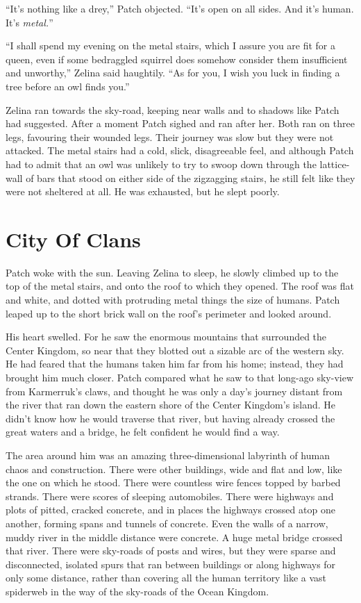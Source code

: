 \documentclass[12pt]{memoir}
\begin{document}
“It’s nothing like a drey,” Patch objected. “It’s open on all
sides. And it’s human. It’s \textit{metal.}”

“I shall spend my evening on the metal stairs, which I assure you are
fit for a queen, even if some bedraggled squirrel does somehow
consider them insufficient and unworthy,” Zelina said haughtily. “As
for you, I wish you luck in finding a tree before an owl finds you.”

Zelina ran towards the sky-road, keeping near walls and to shadows
like Patch had suggested. After a moment Patch sighed and ran after
her. Both ran on three legs, favouring their wounded legs. Their
journey was slow but they were not attacked. The metal stairs had a
cold, slick, disagreeable feel, and although Patch had to admit that
an owl was unlikely to try to swoop down through the lattice-wall of
bars that stood on either side of the zigzagging stairs, he still felt
like they were not sheltered at all. He was exhausted, but he slept
poorly.


\section{City Of Clans}

Patch woke with the sun. Leaving Zelina to sleep, he slowly climbed up
to the top of the metal stairs, and onto the roof to which they
opened. The roof was flat and white, and dotted with protruding metal
things the size of humans. Patch leaped up to the short brick wall on
the roof’s perimeter and looked around.

His heart swelled. For he saw the enormous mountains that surrounded
the Center Kingdom, so near that they blotted out a sizable arc of the
western sky. He had feared that the humans taken him far from his
home; instead, they had brought him much closer. Patch compared what
he saw to that long-ago sky-view from Karmerruk’s claws, and thought
he was only a day’s journey distant from the river that ran down the
eastern shore of the Center Kingdom’s island. He didn’t know how he
would traverse that river, but having already crossed the great waters
and a bridge, he felt confident he would find a way.

The area around him was an amazing three-dimensional labyrinth of
human chaos and construction. There were other buildings, wide and
flat and low, like the one on which he stood. There were countless
wire fences topped by barbed strands. There were scores of sleeping
automobiles. There were highways and plots of pitted, cracked
concrete, and in places the highways crossed atop one another, forming
spans and tunnels of concrete. Even the walls of a narrow, muddy river
in the middle distance were concrete. A huge metal bridge crossed that
river. There were sky-roads of posts and wires, but they were sparse
and disconnected, isolated spurs that ran between buildings or along
highways for only some distance, rather than covering all the human
territory like a vast spiderweb in the way of the sky-roads of the
Ocean Kingdom.
\end{document}
